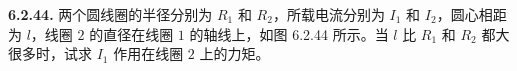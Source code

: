 \vfill
\newpage

\textbf{6.2.44.} 两个圆线圈的半径分别为 $R_{1}$ 和 $R_{2}$，所载电流分别为 $I_{1}$ 和 $I_{2}$，圆心相距为 $l$，线圈 $2$ 的直径在线圈 $1$ 的轴线上，如图 6.2.44 所示。当 $l$ 比 $R_{1}$ 和 $R_{2}$ 都大很多时，试求 $I_{1}$ 作用在线圈 $2$ 上的力矩。

\begin{center}
\end{center}

\vfill
\newpage

